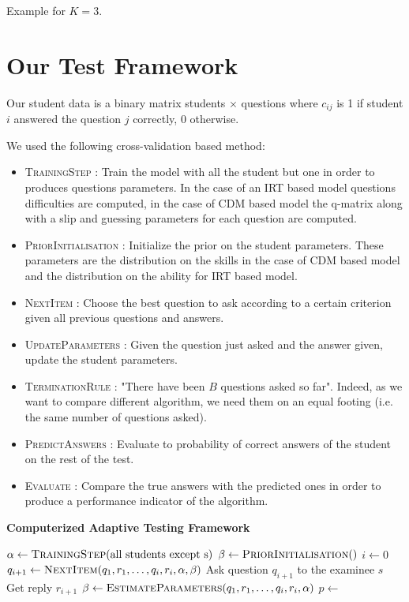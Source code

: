 \documentclass{sig-alternate}
\begin{document}
\begin{table}
\caption{Example for $K = 3$.}
\end{table}

\section{Our Test Framework}

Our student data is a binary matrix students $\times$ questions where $c_{ij}$ is 1 if student $i$ answered the question $j$ correctly, 0 otherwise. 

We used the following cross-validation based method: 

\begin{itemize}
\item \textsc{TrainingStep} : Train the model with all the student but one in order to produces questions parameters. In the case of an IRT based model questions difficulties are computed, in the case of CDM based model the q-matrix along with a slip and guessing parameters for each question are computed. 
\item \textsc{PriorInitialisation} : Initialize the prior on the student parameters.  These parameters are the distribution on the skills in the case of CDM based model and the distribution on the ability for IRT based model. 
\item \textsc{NextItem} : Choose the best question to ask according to a certain criterion given all previous questions and answers. 
\item \textsc{UpdateParameters} : Given the question just asked and the answer given, update the student parameters.
\item \textsc{TerminationRule} : "There have been $B$ questions asked so far". Indeed, as we want to compare different algorithm, we need them on an equal footing (i.e. the same number of questions asked). 
\item \textsc{PredictAnswers} : Evaluate to probability of correct answers of the student on the rest of the test.
\item \textsc{Evaluate} : Compare the true answers with the predicted ones in order to produce a performance indicator of the algorithm. 
\end{itemize}

\begin{algorithm}
\caption*{\textbf{Computerized Adaptive Testing Framework}}
\begin{algorithmic}
	\State $\alpha \gets \Call{TrainingStep}{\text{all students except s}}$
	\State $\beta \gets \Call{PriorInitialisation}$
	\State $i \gets 0$
		\State $q_{i + 1} \gets \Call{NextItem}{q_1, r_1, \ldots, q_i, r_i, \alpha, \beta}$
		\State Ask question $q_{i + 1}$ to the examinee $s$
		\State Get reply $r_{i + 1}$
		\State $\beta \gets \Call{EstimateParameters}{q_1, r_1, \ldots, q_i, r_i, \alpha}$
	\EndWhile
	\State $p \gets$ 
	\State {}
\EndFor
\EndProcedure
\end{algorithmic}
\end{algorithm}
\end{document}

